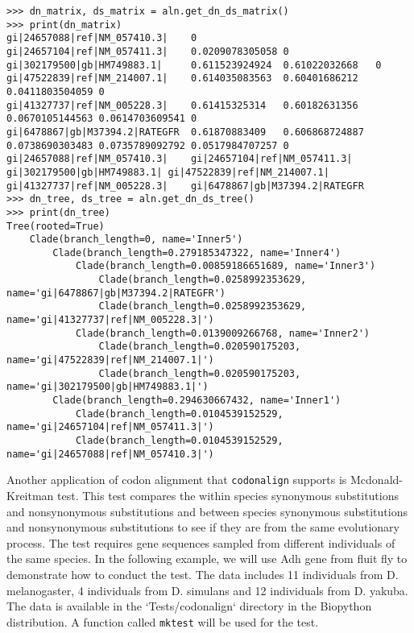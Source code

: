 \documentclass{article}
\begin{document}
\begin{verbatim}
>>> dn_matrix, ds_matrix = aln.get_dn_ds_matrix()
>>> print(dn_matrix)
gi|24657088|ref|NM_057410.3|    0
gi|24657104|ref|NM_057411.3|    0.0209078305058 0
gi|302179500|gb|HM749883.1|     0.611523924924  0.61022032668   0
gi|47522839|ref|NM_214007.1|    0.614035083563  0.60401686212   0.0411803504059 0
gi|41327737|ref|NM_005228.3|    0.61415325314   0.60182631356   0.0670105144563 0.0614703609541 0
gi|6478867|gb|M37394.2|RATEGFR  0.61870883409   0.606868724887  0.0738690303483 0.0735789092792 0.0517984707257 0
gi|24657088|ref|NM_057410.3|    gi|24657104|ref|NM_057411.3|    gi|302179500|gb|HM749883.1| gi|47522839|ref|NM_214007.1|    gi|41327737|ref|NM_005228.3|    gi|6478867|gb|M37394.2|RATEGFR
>>> dn_tree, ds_tree = aln.get_dn_ds_tree()
>>> print(dn_tree)
Tree(rooted=True)
    Clade(branch_length=0, name='Inner5')
        Clade(branch_length=0.279185347322, name='Inner4')
            Clade(branch_length=0.00859186651689, name='Inner3')
                Clade(branch_length=0.0258992353629, name='gi|6478867|gb|M37394.2|RATEGFR')
                Clade(branch_length=0.0258992353629, name='gi|41327737|ref|NM_005228.3|')
            Clade(branch_length=0.0139009266768, name='Inner2')
                Clade(branch_length=0.020590175203, name='gi|47522839|ref|NM_214007.1|')
                Clade(branch_length=0.020590175203, name='gi|302179500|gb|HM749883.1|')
        Clade(branch_length=0.294630667432, name='Inner1')
            Clade(branch_length=0.0104539152529, name='gi|24657104|ref|NM_057411.3|')
            Clade(branch_length=0.0104539152529, name='gi|24657088|ref|NM_057410.3|')
\end{verbatim}

Another application of codon alignment that \texttt{codonalign} supports
is Mcdonald-Kreitman test. This test compares the within species
synonymous substitutions and nonsynonymous substitutions and between
species synonymous substitutions and nonsynonymous substitutions to see
if they are from the same evolutionary process. The test requires gene
sequences sampled from different individuals of the same species. In the
following example, we will use Adh gene from fluit fly to demonstrate
how to conduct the test. The data includes 11 individuals from
D. melanogaster, 4 individuals from D. simulans and 12 individuals from
D. yakuba. The data is available in the `Tests/codonalign` directory in the
Biopython distribution. A function called \texttt{mktest} will be used for
the test.
\end{document}
